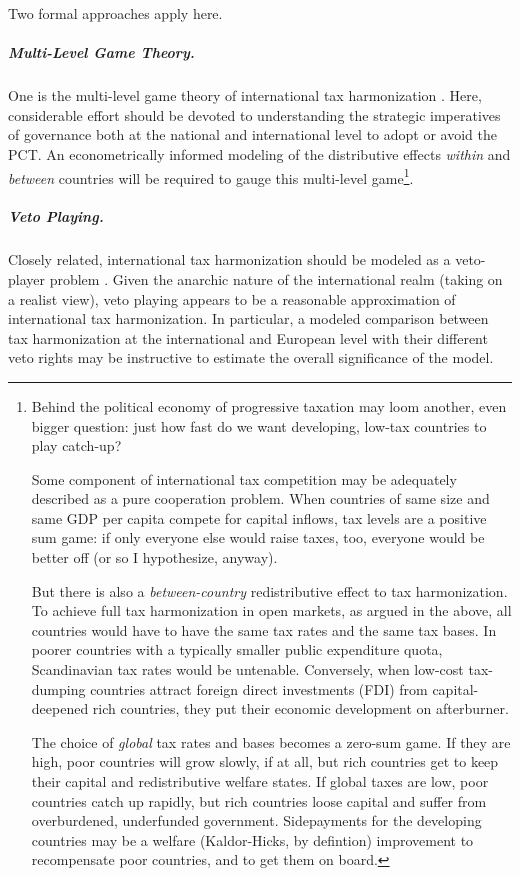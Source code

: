 Two formal approaches apply here.

\subparagraph{Multi-Level Game Theory.}
One is the multi-level game theory of international tax harmonization \citep{Scharpf-1997-aa}.
Here, considerable effort should be devoted to understanding the strategic imperatives of governance both at the national and international level to adopt or avoid the PCT.
An econometrically informed modeling of the distributive effects \emph{within} and \emph{between} countries will be required to gauge this multi-level game\footnote{Behind the political economy of progressive taxation may loom another, even bigger question:
just how fast do we want developing, low-tax countries to play catch-up?

Some component of international tax competition may be adequately described as a pure cooperation problem.
When countries of same size and same GDP per capita compete for capital inflows, tax levels are a positive sum game:
if only everyone else would raise taxes, too, everyone would be better off (or so I hypothesize, anyway).

But there is also a \emph{between-country} redistributive effect to tax harmonization.
To achieve full tax harmonization in open markets, as argued in the above, all countries would have to have the same tax rates and the same tax bases.
In poorer countries with a typically smaller public expenditure quota, Scandinavian tax rates would be untenable.
Conversely, when low-cost tax-dumping countries attract foreign direct investments (FDI) from capital-deepened rich countries, they put their economic development on afterburner.

The choice of \emph{global} tax rates and bases becomes a zero-sum game.
If they are high, poor countries will grow slowly, if at all, but rich countries get to keep their capital and redistributive welfare states.
If global taxes are low, poor countries catch up rapidly, but rich countries loose capital and suffer from overburdened, underfunded government.
Sidepayments for the developing countries may be a welfare (Kaldor-Hicks, by defintion) improvement to recompensate poor countries, and to get them on board.}.

\subparagraph{Veto Playing.}
Closely related, international tax harmonization should be modeled as a veto-player problem \citep{Tsebelis-2002-aa}.
Given the anarchic nature of the international realm (taking on a realist view), veto playing appears to be a reasonable approximation of international tax harmonization.
In particular, a modeled comparison between tax harmonization at the international and European level with their different veto rights may be instructive to estimate the overall significance of the model.

